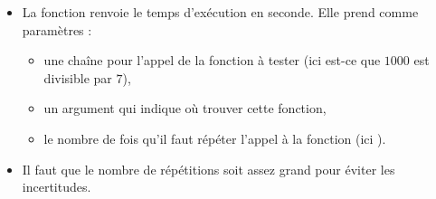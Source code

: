 \documentclass[11pt,class=report,crop=false]{standalone}
\begin{document}
\begin{cours}
\begin{itemize}
  \item La fonction  renvoie le temps d'exécution en seconde.
Elle prend comme paramètres : 
  \begin{itemize}
    \item une chaîne pour l'appel de la fonction à tester (ici est-ce que $1000$ est divisible par $7$),
    \item un argument  qui indique où trouver cette fonction,
    \item le nombre de fois qu'il faut répéter l'appel à la fonction (ici ).
  \end{itemize}
  \item Il faut que le nombre de répétitions soit assez grand pour éviter les incertitudes.
\end{itemize} 

\end{cours}
\end{document}

